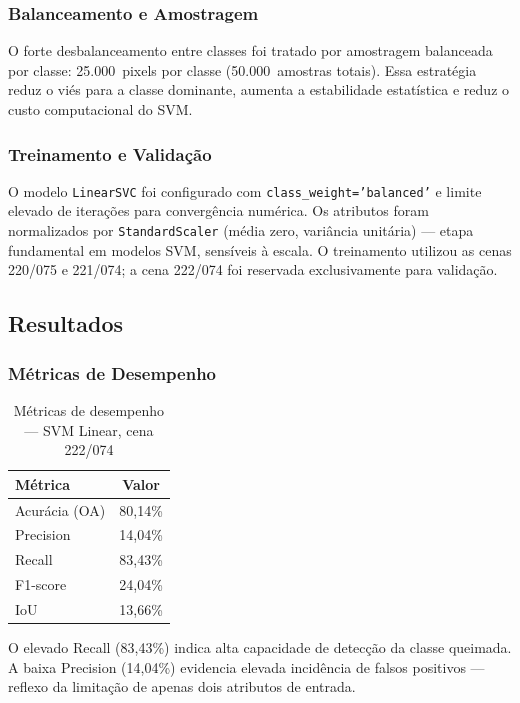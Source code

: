 \documentclass[conference]{IEEEtran}
\begin{document}
\subsubsection{Balanceamento e Amostragem}

O forte desbalanceamento entre classes foi tratado por amostragem
balanceada por classe: 25.000~pixels por classe (50.000~amostras totais).
Essa estratégia reduz o viés para a classe dominante, aumenta a
estabilidade estatística e reduz o custo computacional do SVM.

\subsubsection{Treinamento e Validação}

O modelo \texttt{LinearSVC} foi configurado com
\texttt{class\_weight='balanced'} e limite elevado de iterações para
convergência numérica. Os atributos foram normalizados por
\texttt{StandardScaler} (média zero, variância unitária) — etapa
fundamental em modelos SVM, sensíveis à escala. O treinamento utilizou
as cenas 220/075 e 221/074; a cena 222/074 foi reservada exclusivamente
para validação.

\subsection{Resultados}

\subsubsection{Métricas de Desempenho}

\begin{table}[!t]
  \caption{Métricas de desempenho — SVM Linear, cena 222/074}
  \label{tab:svm_linear_metrics}
  \centering
  \begin{tabular}{lc}
    \toprule
    \textbf{Métrica} & \textbf{Valor} \\
    \midrule
    Acurácia (OA)    & 80,14\% \\
    Precision        & 14,04\% \\
    Recall           & 83,43\% \\
    F1-score         & 24,04\% \\
    IoU              & 13,66\% \\
    \bottomrule
  \end{tabular}
\end{table}

O elevado Recall (83,43\%) indica alta capacidade de detecção da classe
queimada. A baixa Precision (14,04\%) evidencia elevada incidência de
falsos positivos — reflexo da limitação de apenas dois atributos de
entrada.
\end{document}
